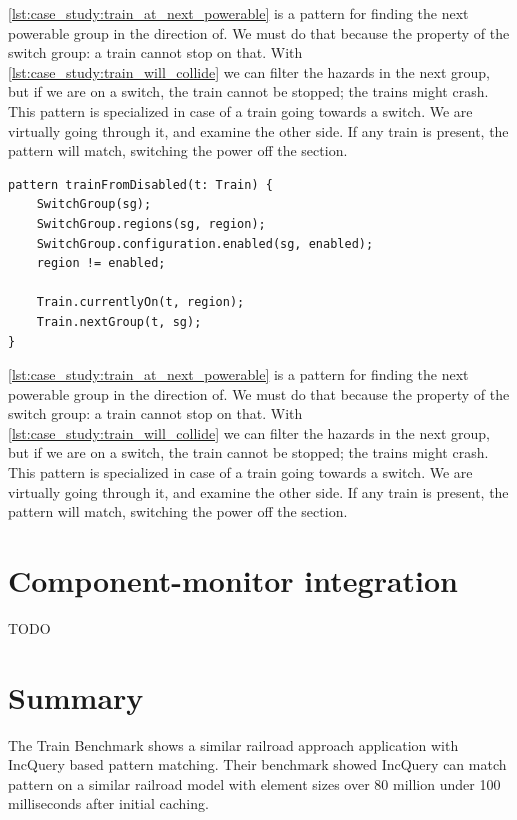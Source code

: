\cref{lst:case_study:train_at_next_powerable} is a pattern for finding the next powerable group in the direction of. We must do that because the property of the switch group: a train cannot stop on that. With \cref{lst:case_study:train_will_collide} we can filter the hazards in the next group, but if we are on a switch, the train cannot be stopped; the trains might crash. This pattern is specialized in case of a train going towards a switch. We are virtually going through it, and examine the other side. If any train is present, the pattern will match, switching the power off the section.
\\[1ex]

\begin{lstlisting}[caption={Collision detection},label=lst:case_study:train_at_next_powerable]
pattern trainFromDisabled(t: Train) {
	SwitchGroup(sg);
	SwitchGroup.regions(sg, region);
	SwitchGroup.configuration.enabled(sg, enabled);
	region != enabled;
	
	Train.currentlyOn(t, region);
	Train.nextGroup(t, sg);
}
\end{lstlisting}

\cref{lst:case_study:train_at_next_powerable} is a pattern for finding the next powerable group in the direction of. We must do that because the property of the switch group: a train cannot stop on that. With \cref{lst:case_study:train_will_collide} we can filter the hazards in the next group, but if we are on a switch, the train cannot be stopped; the trains might crash. This pattern is specialized in case of a train going towards a switch. We are virtually going through it, and examine the other side. If any train is present, the pattern will match, switching the power off the section.

\section{Component-monitor integration}

TODO

\section{Summary}

The Train Benchmark\cite{TrainBenchmark} shows a similar railroad approach application with IncQuery based pattern matching. Their benchmark showed IncQuery can match pattern on a similar railroad model with element sizes over 80 million under 100 milliseconds after initial caching.